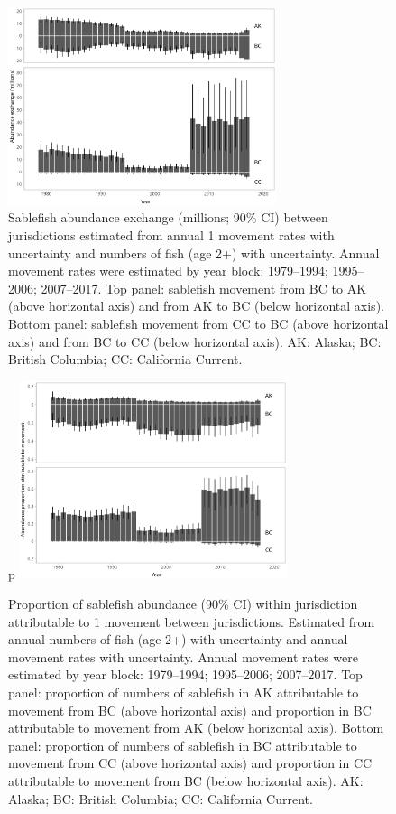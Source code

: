 \documentclass{article}
\begin{document}
\begin{figure}[htb]
    \centering
    \includegraphics[width = 0.7\textwidth]{bar-abundance-exchange}
    \caption{Sablefish abundance exchange (millions; 90\%{} CI) between jurisdictions estimated from annual 1\degree{} movement rates with uncertainty and numbers of fish (age 2+) with uncertainty. Annual movement rates were estimated by year block: 1979--1994; 1995--2006; 2007--2017. Top panel: sablefish movement from BC to AK (above horizontal axis) and from AK to BC (below horizontal axis). Bottom panel: sablefish movement from CC to BC (above horizontal axis) and from BC to CC (below horizontal axis). AK: Alaska; BC: British Columbia; CC: California Current.}
    \label{fig:bar-abundance-exchange}
\end{figure}

\begin{figure}[htb]
p    \centering
    \includegraphics[width = 0.7\textwidth]{bar-percent-attributable}
    \caption{Proportion of sablefish abundance (90\%{} CI) within jurisdiction attributable to 1\degree{} movement between jurisdictions. Estimated from annual numbers of fish (age 2+) with uncertainty and annual movement rates with uncertainty. Annual movement rates were estimated by year block: 1979--1994; 1995--2006; 2007--2017. Top panel: proportion of numbers of sablefish in AK attributable to movement from BC (above horizontal axis) and proportion in BC attributable to movement from AK (below horizontal axis). Bottom panel: proportion of numbers of sablefish in BC attributable to movement from CC (above horizontal axis) and proportion in CC attributable to movement from BC (below horizontal axis). AK: Alaska; BC: British Columbia; CC: California Current.}
    \label{fig:bar-percent-attributable}
\end{figure}
\end{document}
